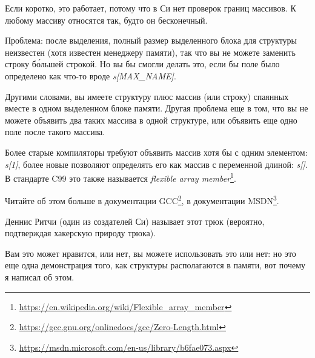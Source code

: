 Если коротко, это работает, потому что в Си нет проверок границ массивов. К любому массиву относятся так, будто он бесконечный.

Проблема: после выделения, полный размер выделенного блока для структуры неизвестен (хотя известен менеджеру памяти),
так что вы не можете заменить строку б\'{о}льшей строкой.
Но вы бы смогли делать это, если бы поле было определено как что-то вроде \emph{s[MAX\_NAME]}.

Другими словами, вы имеете структуру плюс массив (или строку) спаянных вместе в одном выделенном блоке памяти.
Другая проблема еще в том, что вы не можете объявить два таких массива в одной структуре, или объявить еще одно поле
после такого массива.

Более старые компиляторы требуют объявить массив хотя бы с одним элементом: \emph{s[1]}, более новые позволяют
определять его как массив с переменной длиной: \emph{s[]}.
В стандарте C99 это также называется \emph{flexible array member}\footnote{\url{https://en.wikipedia.org/wiki/Flexible_array_member}}.

Читайте об этом больше в документации GCC\footnote{\url{https://gcc.gnu.org/onlinedocs/gcc/Zero-Length.html}},
в документации MSDN\footnote{\url{https://msdn.microsoft.com/en-us/library/b6fae073.aspx}}.

Деннис Ритчи (один из создателей Си) называет этот трюк  
(вероятно, подтверждая хакерскую природу трюка).

Вам это может нравится, или нет, вы можете использовать это или нет:
но это еще одна демонстрация того, как структуры располагаются в памяти, вот почему я написал об этом.

